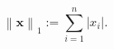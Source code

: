 \documentclass[10pt]{article} %
\begin{document}
\color{fgC}\[\left\|{\boldsymbol {x}}\right\|_{1}:=\sum _{i=1}^{n}\left|x_{i}\right|.\]
\end{document}
